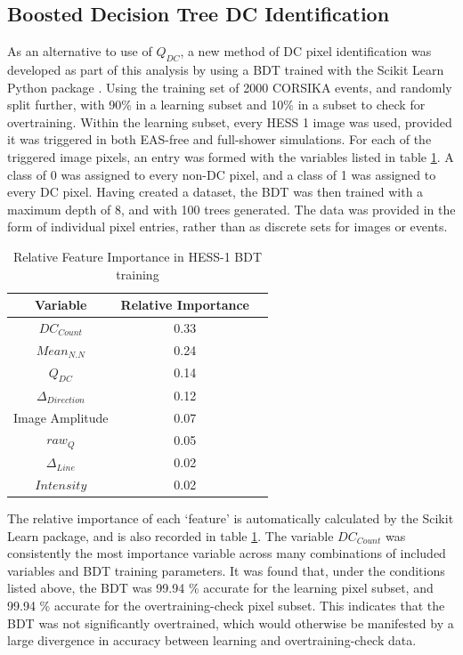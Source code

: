 \documentclass{article}
\begin{document}
\subsection{Boosted Decision Tree DC Identification}
As an alternative to use of $Q_{DC}$, a new method of DC pixel identification was developed as part of this analysis by using a BDT trained with the Scikit Learn Python package \cite{scikit-learn}. Using the training set of 2000 CORSIKA events, and randomly split further, with 90\% in a learning subset and 10\% in a subset to check for overtraining. Within the learning subset, every HESS 1 image was used, provided it was triggered in both EAS-free and full-shower simulations. For each of the triggered image pixels, an entry was formed with the variables listed in table \ref{tab:hess1classifier}. A class of 0 was assigned to every non-DC pixel, and a class of 1 was assigned to every DC pixel. Having created a dataset, the BDT was then trained with a maximum depth of 8, and with 100 trees generated. The data was provided in the form of individual pixel entries, rather than as discrete sets for images or events.

\begin{table}[h!]
  \centering
  \caption{Relative Feature Importance in HESS-1 BDT training}
  \label{tab:hess1classifier}
  \begin{tabular}{ccc}
    \toprule
    Variable & Relative Importance\\
    \midrule
    $DC_{Count}$ & 0.33\\
    $Mean_{N.N}$ & 0.24\\
    $Q_{DC}$ & 0.14\\
    $\Delta_{Direction}$ & 0.12\\
    Image Amplitude & 0.07\\
    $raw_{Q}$ & 0.05\\
    $\Delta_{Line}$ & 0.02\\
    $Intensity$ & 0.02\\
    \bottomrule
  \end{tabular}
\end{table}

The relative importance of each \textquoteleft feature' is automatically calculated by the Scikit Learn package, and is also recorded in table \ref{tab:hess1classifier}. The variable $DC_{Count}$ was consistently the most importance variable across many combinations of included variables and BDT training parameters. It was found that, under the conditions listed above, the BDT was 99.94 \% accurate for the learning pixel subset, and 99.94 \%  accurate for the overtraining-check pixel subset. This indicates that the BDT was not significantly overtrained, which would otherwise be manifested by a large divergence in accuracy between learning and overtraining-check data.
\end{document}
